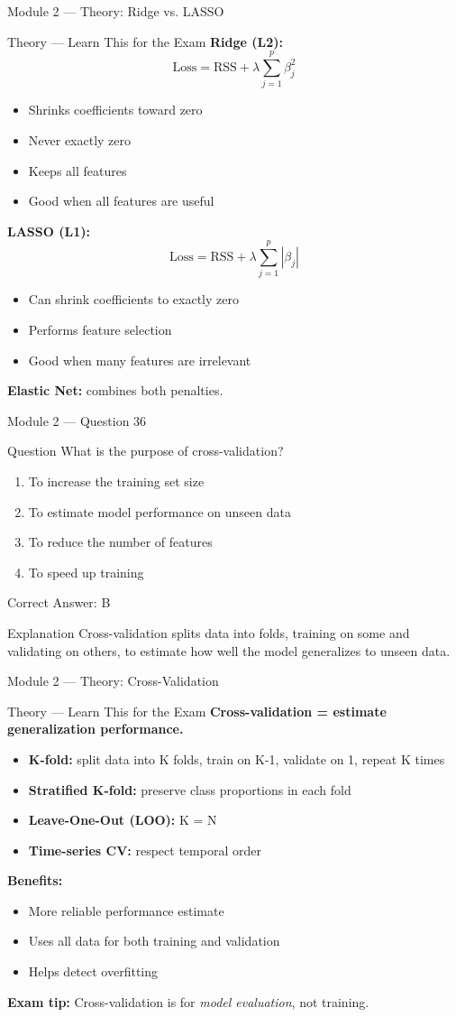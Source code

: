 \documentclass[aspectratio=169,10pt]{beamer}
\newcommand{\question}[1]{%
	\begin{block}{Question}
		#1
	\end{block}
}
\newcommand{\options}[4]{%
	\begin{enumerate}[label=\Alph*.,leftmargin=*]
		\item #1
		\item #2
		\item #3
		\item #4
	\end{enumerate}
}
\newcommand{\answerbox}[1]{%
	\begin{exampleblock}{Correct Answer: #1}
	\end{exampleblock}
}
\newcommand{\explain}[1]{%
	\begin{block}{Explanation}
		\small #1
	\end{block}
}
\newcommand{\theory}[1]{%
	\begin{block}{Theory --- Learn This for the Exam}
		\small #1
	\end{block}
}
\begin{document}
	\begin{frame}{Module 2 --- Theory: Ridge vs. LASSO}
		\theory{
			\textbf{Ridge (L2):}
			\[
			\text{Loss} = \text{RSS} + \lambda \sum_{j=1}^{p} \beta_j^2
			\]
			\begin{itemize}
				\item Shrinks coefficients toward zero
				\item Never exactly zero
				\item Keeps all features
				\item Good when all features are useful
			\end{itemize}
			\textbf{LASSO (L1):}
			\[
			\text{Loss} = \text{RSS} + \lambda \sum_{j=1}^{p} |\beta_j|
			\]
			\begin{itemize}
				\item Can shrink coefficients to exactly zero
				\item Performs feature selection
				\item Good when many features are irrelevant
			\end{itemize}
			\textbf{Elastic Net:} combines both penalties.
		}
	\end{frame}
	
	\begin{frame}{Module 2 --- Question 36}
		\question{What is the purpose of cross-validation?}
		\options{To increase the training set size}{To estimate model performance on unseen data}{To reduce the number of features}{To speed up training}
		\answerbox{B}
		\explain{Cross-validation splits data into folds, training on some and validating on others, to estimate how well the model generalizes to unseen data.}
	\end{frame}
	
	\begin{frame}{Module 2 --- Theory: Cross-Validation}
		\theory{
			\textbf{Cross-validation = estimate generalization performance.}
			\begin{itemize}
				\item \textbf{K-fold:} split data into K folds, train on K-1, validate on 1, repeat K times
				\item \textbf{Stratified K-fold:} preserve class proportions in each fold
				\item \textbf{Leave-One-Out (LOO):} K = N
				\item \textbf{Time-series CV:} respect temporal order
			\end{itemize}
			\textbf{Benefits:}
			\begin{itemize}
				\item More reliable performance estimate
				\item Uses all data for both training and validation
				\item Helps detect overfitting
			\end{itemize}
			\textbf{Exam tip:} Cross-validation is for \emph{model evaluation}, not training.
		}
	\end{frame}
	
\end{document}
